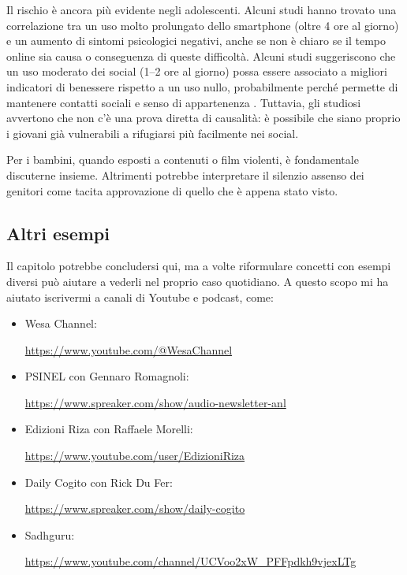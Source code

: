 \documentclass[12pt]{book} %
\begin{document}
\begin{mdframed}[linewidth=1pt]
Il rischio è ancora più evidente negli adolescenti. Alcuni studi hanno trovato una correlazione tra un uso molto prolungato dello smartphone (oltre 4 ore al giorno) e un aumento di sintomi psicologici negativi, anche se non è chiaro se il tempo online sia causa o conseguenza di queste difficoltà. Alcuni studi suggeriscono che un uso moderato dei social (1–2 ore al giorno) possa essere associato a migliori indicatori di benessere rispetto a un uso nullo, probabilmente perché permette di mantenere contatti sociali e senso di appartenenza . Tuttavia, gli studiosi avvertono che non c’è una prova diretta di causalità: è possibile che siano proprio i giovani già vulnerabili a rifugiarsi più facilmente nei social.

Per i bambini, quando esposti a contenuti o film violenti, è fondamentale discuterne insieme. Altrimenti potrebbe interpretare il silenzio assenso dei
genitori come tacita approvazione di quello che è appena stato visto.
\end{mdframed}

\subsection{Altri esempi}
Il capitolo potrebbe concludersi qui, ma a volte riformulare concetti con esempi diversi può aiutare a vederli nel proprio caso quotidiano.
A questo scopo mi ha aiutato iscrivermi a canali di Youtube e podcast, come:

\begin{itemize}
\item Wesa Channel: \raggedright\url{https://www.youtube.com/@WesaChannel} 
\item PSINEL con Gennaro Romagnoli: \raggedright\url{https://www.spreaker.com/show/audio-newsletter-anl} 
\item Edizioni Riza con Raffaele Morelli: \raggedright\url{https://www.youtube.com/user/EdizioniRiza}
\item Daily Cogito con Rick Du Fer: \raggedright\url{https://www.spreaker.com/show/daily-cogito} 
\item Sadhguru: \raggedright\url{https://www.youtube.com/channel/UCVoo2xW\_PFFpdkh9vjexLTg} 
\end{itemize}
\end{document}
